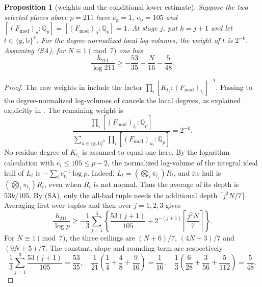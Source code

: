 \documentclass[11pt]{article}
\theoremstyle{plain}
\newtheorem{proposition}[theorem]{Proposition}
\theoremstyle{definition}
\newcommand{\Fmod}{F_{\mathrm{mod}}}
\newcommand{\SA}{\textup{(SA)}}
\begin{document}
\begin{proposition}[weights and the conditional lower estimate]\label{prop:weights}
Suppose the two selected places above $p=211$ have
$e_{\mathrm g}=1$, $e_{\mathrm b}=105$ and
$[(\Fmod)_{\mathrm g}:\mathbb Q_p]=[(\Fmod)_{\mathrm b}:\mathbb Q_p]=1$.
At stage $j$, put $k=j+1$ and let $t\in\{\mathrm g,\mathrm b\}^k$.
For the degree-normalized local log-volumes, the weight of $t$ is $2^{-k}$.
Assuming \SA{}, for $N\equiv1\pmod7$ one has
\[
 \frac{h_{211}}{\log211}\ge
 -\frac{53}{35}-\frac{N}{16}-\frac{5}{48}.
\]
\end{proposition}
\begin{proof}
The raw weights in \cite[Remark 3.1.1(ii)]{IUT3} include the factor
$\prod_i[K_{t_i}:(\Fmod)_{t_i}]^{-1}$.  Passing to the degree-normalized
log-volumes of \cite[Proposition 1.4(i)]{IUT4} cancels the local degrees, as
explained explicitly in \cite[Remark 1.7.1]{IUT4}.  The remaining weight is
\[
 \frac{\prod_i[(\Fmod)_{t_i}:\mathbb Q_p]}
 {\sum_{u\in\{\mathrm g,\mathrm b\}^k}\prod_i[(\Fmod)_{u_i}:\mathbb Q_p]}
 =2^{-k}.
\]
No residue degree of $K_{t_i}$ is assumed to equal one here.
By the logarithm calculation with $e_i\le105\le p-2$, the normalized log-volume of the integral
ideal hull of $L_t$ is $-\sum_i e_{t_i}^{-1}\log p$.
Indeed, $L_t=(\bigotimes_i\pi_{t_i})R_t$, and its hull is
$(\bigotimes_i\pi_{t_i})\widetilde R_t$, even when $R_t$ is not normal.
Thus the average of its depth is $53k/105$.
By \SA{}, only the all-bad tuple needs the additional depth
$\lceil j^2N/7\rceil$.  Averaging first over tuples and then over $j=1,2,3$ gives
\[
 \frac{h_{211}}{\log p}\ge
 -\frac13\sum_{j=1}^3\left\{
 \frac{53(j+1)}{105}+2^{-(j+1)}\left\lceil\frac{j^2N}{7}\right\rceil
 \right\}.
\]
For $N\equiv1\pmod7$, the three ceilings are
$(N+6)/7$, $(4N+3)/7$ and $(9N+5)/7$.
The constant, slope and rounding term are respectively
\[
 \frac13\sum_{j=1}^3\frac{53(j+1)}{105}=\frac{53}{35},\quad
 \frac1{21}\left(\frac14+\frac48+\frac9{16}\right)=\frac1{16},\quad
 \frac13\left(\frac6{28}+\frac3{56}+\frac5{112}\right)=\frac5{48}.
\]
\end{proof}
\end{document}
